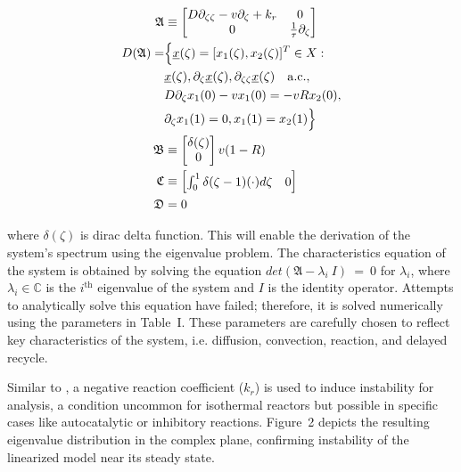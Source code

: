 \begin{equation} \label{eq:2_operator_A}
    \begin{aligned}
        \mathfrak{A} &\equiv
        \begin{bmatrix}
            D \partial_{\zeta \zeta} - v \partial_\zeta + k_r & 0 \\
            0 & \frac{1}{\tau} \partial_\zeta
        \end{bmatrix} \\
        D(\mathfrak{A}) =& \Bigl\{ \underline{x}(\zeta) = [x_1(\zeta), x_2(\zeta)]^T \in X:\\
        &\underline{x}(\zeta), \partial_\zeta \underline{x}(\zeta), \partial_{\zeta \zeta} \underline{x}(\zeta) \quad \mathrm{a.c.},\\
        &D \partial_\zeta x_1(0) - v x_1(0) = -v R x_2(0),\\
        &\partial_\zeta x_1(1) = 0,
        x_1(1) = x_2(1) \Bigr\}\\
        \mathfrak{B} &\equiv
        \begin{bmatrix}
            \delta(\zeta) \\
            0
        \end{bmatrix} v(1-R) \\
        \mathfrak{C} &\equiv
        \begin{bmatrix}
            \int_0^1 \delta(\zeta-1) (\cdot) d\zeta & 0
        \end{bmatrix} \\
        \mathfrak{D} &= 0
    \end{aligned}
\end{equation}

where $\delta(\zeta)$ is dirac delta function. This will enable the derivation of the system's spectrum using the eigenvalue problem. The characteristics equation of the system is obtained by solving the equation $det(\mathfrak{A}-\lambda_i~I)~=~0$ for $\lambda_i$, where $\lambda_i \in \mathbb{C}$ is the $i^{\text{th}}$ eigenvalue of the system and $I$ is the identity operator. Attempts to analytically solve this equation have failed; therefore, it is solved numerically using the parameters in Table~I. These parameters are carefully chosen to reflect key characteristics of the system, i.e. diffusion, convection, reaction, and delayed recycle. 

Similar to \cite{moadeli2025optimal}, a negative reaction coefficient ($k_r$) is used to induce instability for analysis, a condition uncommon for isothermal reactors but possible in specific cases like autocatalytic or inhibitory reactions. Figure~2 depicts the resulting eigenvalue distribution in the complex plane, confirming instability of the linearized model near its steady state.


